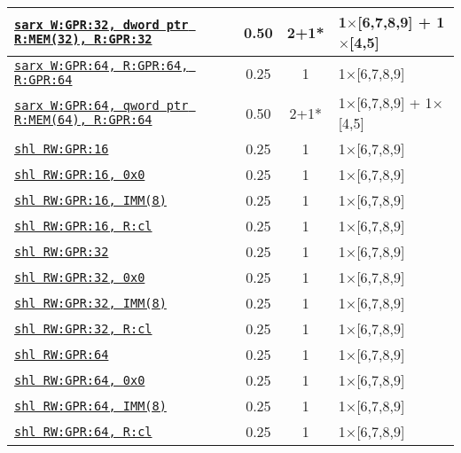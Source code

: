 \documentclass[a4paper,english,fontsize=9]{scrartcl}
\begin{document}
\begin{longtable}{p{}ccL{.25\textwidth}}
  \midrule
  \texttt{\href{https://felixcloutier.com/x86/SARX:SHLX:SHRX.html}{sarx W:GPR:32, dword ptr R:MEM(32), R:GPR:32}} & 0.50 & 2+1* & 1\(\times\)[6,7,8,9] + 1\(\times\)[4,5] \\
  \midrule
  \texttt{\href{https://felixcloutier.com/x86/SARX:SHLX:SHRX.html}{sarx W:GPR:64, R:GPR:64, R:GPR:64}} & 0.25 & 1 & 1\(\times\)[6,7,8,9] \\
  \midrule
  \texttt{\href{https://felixcloutier.com/x86/SARX:SHLX:SHRX.html}{sarx W:GPR:64, qword ptr R:MEM(64), R:GPR:64}} & 0.50 & 2+1* & 1\(\times\)[6,7,8,9] + 1\(\times\)[4,5] \\
  \midrule
  \texttt{\href{https://felixcloutier.com/x86/SAL:SAR:SHL:SHR.html}{shl RW:GPR:16}} & 0.25 & 1 & 1\(\times\)[6,7,8,9] \\
  \midrule
  \texttt{\href{https://felixcloutier.com/x86/SAL:SAR:SHL:SHR.html}{shl RW:GPR:16, 0x0}} & 0.25 & 1 & 1\(\times\)[6,7,8,9] \\
  \midrule
  \texttt{\href{https://felixcloutier.com/x86/SAL:SAR:SHL:SHR.html}{shl RW:GPR:16, IMM(8)}} & 0.25 & 1 & 1\(\times\)[6,7,8,9] \\
  \midrule
  \texttt{\href{https://felixcloutier.com/x86/SAL:SAR:SHL:SHR.html}{shl RW:GPR:16, R:cl}} & 0.25 & 1 & 1\(\times\)[6,7,8,9] \\
  \midrule
  \texttt{\href{https://felixcloutier.com/x86/SAL:SAR:SHL:SHR.html}{shl RW:GPR:32}} & 0.25 & 1 & 1\(\times\)[6,7,8,9] \\
  \midrule
  \texttt{\href{https://felixcloutier.com/x86/SAL:SAR:SHL:SHR.html}{shl RW:GPR:32, 0x0}} & 0.25 & 1 & 1\(\times\)[6,7,8,9] \\
  \midrule
  \texttt{\href{https://felixcloutier.com/x86/SAL:SAR:SHL:SHR.html}{shl RW:GPR:32, IMM(8)}} & 0.25 & 1 & 1\(\times\)[6,7,8,9] \\
  \midrule
  \texttt{\href{https://felixcloutier.com/x86/SAL:SAR:SHL:SHR.html}{shl RW:GPR:32, R:cl}} & 0.25 & 1 & 1\(\times\)[6,7,8,9] \\
  \midrule
  \texttt{\href{https://felixcloutier.com/x86/SAL:SAR:SHL:SHR.html}{shl RW:GPR:64}} & 0.25 & 1 & 1\(\times\)[6,7,8,9] \\
  \midrule
  \texttt{\href{https://felixcloutier.com/x86/SAL:SAR:SHL:SHR.html}{shl RW:GPR:64, 0x0}} & 0.25 & 1 & 1\(\times\)[6,7,8,9] \\
  \midrule
  \texttt{\href{https://felixcloutier.com/x86/SAL:SAR:SHL:SHR.html}{shl RW:GPR:64, IMM(8)}} & 0.25 & 1 & 1\(\times\)[6,7,8,9] \\
  \midrule
  \texttt{\href{https://felixcloutier.com/x86/SAL:SAR:SHL:SHR.html}{shl RW:GPR:64, R:cl}} & 0.25 & 1 & 1\(\times\)[6,7,8,9] \\

\end{longtable}
\end{document}
